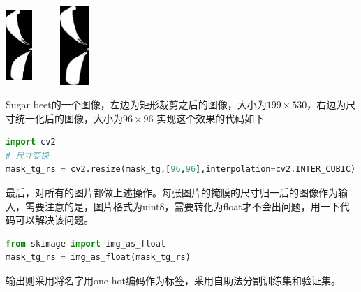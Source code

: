 \begin{center}
\includegraphics[width=10mm,height=30mm]{../figures/Sugar_beet_1bdfd2206_mask_tg.png} 	
\includegraphics[width=30mm,height=30mm]{../figures/Sugar_beet_1bdfd2206_mask_tg.png} 	\\
\end{center}
Sugar beet的一个图像，左边为矩形裁剪之后的图像，大小为$199\times 530$，右边为尺寸统一化后的图像，大小为$96\times 96$
实现这个效果的代码如下
\begin{lstlisting}[language=python]
import cv2
# 尺寸变换
mask_tg_rs = cv2.resize(mask_tg,[96,96],interpolation=cv2.INTER_CUBIC)
\end{lstlisting}
最后，对所有的图片都做上述操作。每张图片的掩膜的尺寸归一后的图像作为输入，需要注意的是，图片格式为uint8，需要转化为float才不会出问题，用一下代码可以解决该问题。
\begin{lstlisting}[language=python]
from skimage import img_as_float
mask_tg_rs = img_as_float(mask_tg_rs) 
\end{lstlisting}
输出则采用将名字用one-hot编码作为标签，采用自助法分割训练集和验证集。


